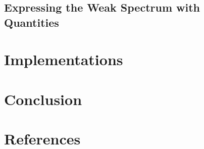 \documentclass[
  a4paper,
]{report}
\theoremstyle{plain}
\theoremstyle{plain}
\theoremstyle{definition}
\theoremstyle{plain}
\theoremstyle{definition}
\theoremstyle{remark}
\begin{document}
\section{Expressing the Weak Spectrum with
Quantities}\label{expressing-the-weak-spectrum-with-quantities}


\chapter{Implementations}\label{implementations}


\chapter{Conclusion}\label{conclusion}


\chapter*{References}\label{references}


\renewcommand{\bibsection}{}

\end{document}
